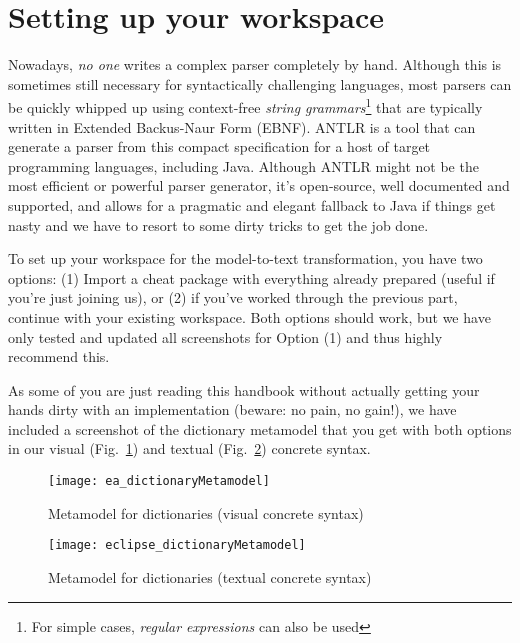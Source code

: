 \newpage
\section{Setting up your workspace}
\genHeader

Nowadays, \emph{no one} writes a complex parser completely by hand. Although this is sometimes still necessary for syntactically challenging languages, most
parsers can be quickly whipped up using context-free \emph{string grammars}\footnote{For simple cases, \emph{regular expressions} can also be used} that are
typically written in Extended Backus-Naur Form (EBNF). ANTLR is a tool that can generate a parser from this compact specification for
a host of target programming languages, including Java. Although ANTLR might not be the most efficient or powerful parser generator, it's open-source, well
documented and supported, and allows for a pragmatic and elegant fallback to Java if things get nasty and we have to resort to some dirty tricks to get the job
done.

To set up your workspace for the model-to-text transformation, you have two options: (1) Import a cheat package with everything already
prepared (useful if you're just joining us), or (2) if you've worked through the previous part, continue with your existing workspace. 
Both options should work, but we have only tested and updated all screenshots for Option (1) and thus highly recommend this.

As some of you are just reading this handbook without actually getting your hands dirty with an implementation (beware: no pain, no gain!), we have included a
screenshot of the dictionary metamodel that you get with both options in our visual (Fig.~\ref{ea:dictLang}) and textual (Fig.~\ref{eclipse:dictLangMetamodel})
concrete syntax.

\vspace{0.5cm}

\begin{figure}[htbp]
\begin{centering}
  \texttt{[image: ea\_dictionaryMetamodel]}
  \caption{Metamodel for dictionaries (visual concrete syntax)}
  \label{ea:dictLang}
  \end{centering}
\end{figure}

\newpage

\begin{figure}[h!]
  \hspace{-1.5cm}
  \texttt{[image: eclipse\_dictionaryMetamodel]}
  \caption{Metamodel for dictionaries (textual concrete syntax)}
  \label{eclipse:dictLangMetamodel}
\end{figure}


